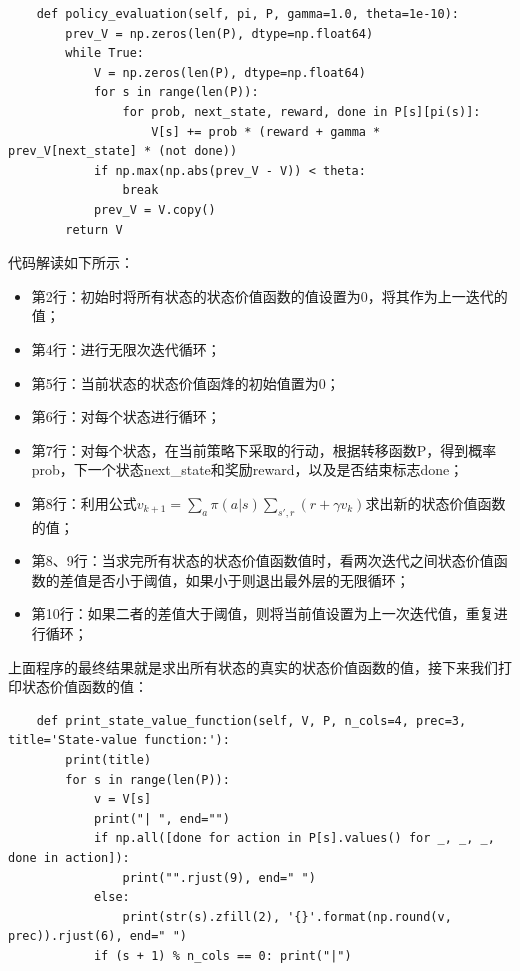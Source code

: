 \begin{lstlisting}
    def policy_evaluation(self, pi, P, gamma=1.0, theta=1e-10):
        prev_V = np.zeros(len(P), dtype=np.float64)
        while True:
            V = np.zeros(len(P), dtype=np.float64)
            for s in range(len(P)):
                for prob, next_state, reward, done in P[s][pi(s)]:
                    V[s] += prob * (reward + gamma * prev_V[next_state] * (not done))
            if np.max(np.abs(prev_V - V)) < theta:
                break
            prev_V = V.copy()
        return V
\end{lstlisting}
代码解读如下所示：
\begin{itemize}
    \item 第2行：初始时将所有状态的状态价值函数的值设置为0，将其作为上一迭代的值；
    \item 第4行：进行无限次迭代循环；
    \item 第5行：当前状态的状态价值函烽的初始值置为0；
    \item 第6行：对每个状态进行循环；
    \item 第7行：对每个状态，在当前策略下采取的行动，根据转移函数P，得到概率prob，下一个状态next\_state和奖励reward，以及是否结束标志done；
    \item 第8行：利用公式$v_{k+1}=\sum_{a} \pi(a|s) \sum_{s',r} (r + \gamma v_{k})$求出新的状态价值函数的值；
    \item 第8、9行：当求完所有状态的状态价值函数值时，看两次迭代之间状态价值函数的差值是否小于阈值，如果小于则退出最外层的无限循环；
    \item 第10行：如果二者的差值大于阈值，则将当前值设置为上一次迭代值，重复进行循环；
\end{itemize}
上面程序的最终结果就是求出所有状态的真实的状态价值函数的值，接下来我们打印状态价值函数的值：
\begin{lstlisting}
    def print_state_value_function(self, V, P, n_cols=4, prec=3, title='State-value function:'):
        print(title)
        for s in range(len(P)):
            v = V[s]
            print("| ", end="")
            if np.all([done for action in P[s].values() for _, _, _, done in action]):
                print("".rjust(9), end=" ")
            else:
                print(str(s).zfill(2), '{}'.format(np.round(v, prec)).rjust(6), end=" ")
            if (s + 1) % n_cols == 0: print("|")
\end{lstlisting}
